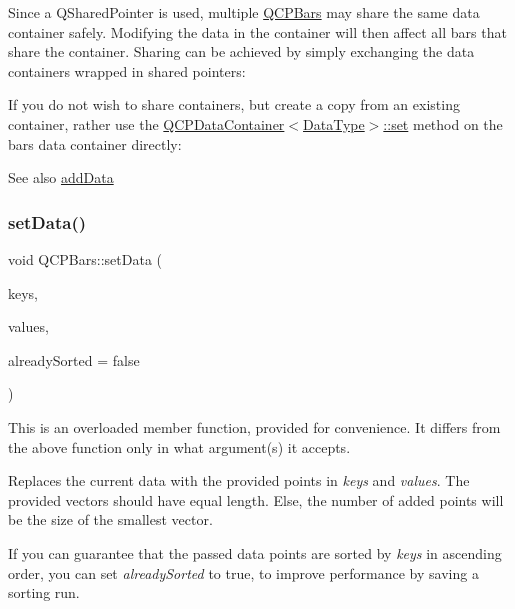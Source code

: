 Since a Q\+Shared\+Pointer is used, multiple \hyperlink{classQCPBars}{Q\+C\+P\+Bars} may share the same data container safely. Modifying the data in the container will then affect all bars that share the container. Sharing can be achieved by simply exchanging the data containers wrapped in shared pointers\+: 
\begin{DoxyCodeInclude}
\end{DoxyCodeInclude}
 If you do not wish to share containers, but create a copy from an existing container, rather use the \hyperlink{classQCPDataContainer_ae7042bd534fc3ce7befa2ce3f790b5bf}{Q\+C\+P\+Data\+Container$<$\+Data\+Type$>$\+::set} method on the bar\textquotesingle{}s data container directly\+: 
\begin{DoxyCodeInclude}
\end{DoxyCodeInclude}
 \begin{DoxySeeAlso}{See also}
\hyperlink{classQCPBars_a323d6970d6d6e3166d89916a7f60f733}{add\+Data} 
\end{DoxySeeAlso}
\mbox{\label{classQCPBars_a2a88cd5b16ec7b71e5a590f95b50c5ce}} 
\subsubsection{\texorpdfstring{set\+Data()}{setData()}\hspace{0.1cm}{\footnotesize\ttfamily [2/2]}}
{\footnotesize\ttfamily void Q\+C\+P\+Bars\+::set\+Data (\begin{DoxyParamCaption}\item[{const Q\+Vector$<$ double $>$ \&}]{keys,  }\item[{const Q\+Vector$<$ double $>$ \&}]{values,  }\item[{bool}]{already\+Sorted = {\ttfamily false} }\end{DoxyParamCaption})}

This is an overloaded member function, provided for convenience. It differs from the above function only in what argument(s) it accepts.

Replaces the current data with the provided points in {\itshape keys} and {\itshape values}. The provided vectors should have equal length. Else, the number of added points will be the size of the smallest vector.

If you can guarantee that the passed data points are sorted by {\itshape keys} in ascending order, you can set {\itshape already\+Sorted} to true, to improve performance by saving a sorting run.

